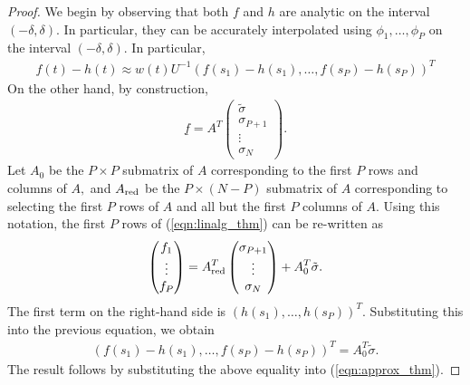 \begin{proof}
We begin by observing that both $f$ and $h$ are analytic on the interval $(-\delta,\delta).$ In particular, they can be accurately interpolated using $\phi_1,\dots,\phi_P$ on the interval $(-\delta,\delta).$ In particular, 
\begin{align}\label{eqn:approx_thm}
f(t)-h(t) \approx w(t) U^{-1} (f(s_1)-h(s_1),\dots,f(s_P)-h(s_P))^T
\end{align}
On the other hand, by construction,
\begin{align}\label{eqn:linalg_thm}
\underline{f} = A^T \begin{pmatrix}\tilde{\sigma}\\ \sigma_{P+1}\\ \vdots\\ \sigma_N\end{pmatrix}.
\end{align}
Let $A_0$ be the $P\times P$ submatrix of $A$ corresponding to the first $P$ rows and columns of $A,$ and $A_{\rm red}$ be the $P \times (N-P)$  submatrix of $A$ corresponding to selecting the first $P$ rows of $A$ and all but the first $P$ columns of $A.$ Using this notation, the first $P$ rows of (\ref{eqn:linalg_thm}) can be re-written as
\begin{align}
\begin{pmatrix}f_1\\\vdots \\ f_P\end{pmatrix}  = A_{\rm red}^T \begin{pmatrix} \sigma_{P+1}\\ \vdots\\ \sigma_N\end{pmatrix} + A_0^T \tilde{\sigma}.
\end{align}
The first term on the right-hand side is $(h(s_1),\dots,h(s_P))^T.$ Substituting this into the previous equation, we obtain
\begin{align}
(f(s_1)-h(s_1),\dots,f(s_P)-h(s_P))^T = A_0^T \tilde{\sigma}.
\end{align}
The result follows by substituting the above equality into (\ref{eqn:approx_thm}).
\end{proof}

